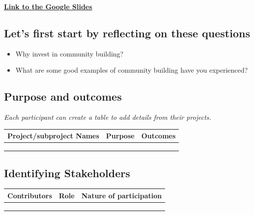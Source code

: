 \documentclass[
  letterpaper,
  DIV=11,
  numbers=noendperiod]{scrreport}
\providecommand{\tightlist}{%
  \setlength{\itemsep}{0pt}\setlength{\parskip}{0pt}}\usepackage{longtable,booktabs,array}
\begin{document}
\href{https://docs.google.com/presentation/d/18kxCLkNEZBVfZ-IBMkE_Un0W67MBoEPbGabygMvqeRY/edit\#slide=id.g13faa93073d_0_111}{\textbf{Link
to the Google Slides}}

\hypertarget{lets-first-start-by-reflecting-on-these-questions}{%
\subsection{Let's first start by reflecting on these
questions}\label{lets-first-start-by-reflecting-on-these-questions}}

\begin{itemize}
\tightlist
\item
  Why invest in community building?
\item
  What are some good examples of community building have you
  experienced?
\end{itemize}

\hypertarget{purpose-and-outcomes}{%
\subsection{\texorpdfstring{\textbf{Purpose and
outcomes}}{Purpose and outcomes}}\label{purpose-and-outcomes}}

\emph{Each participant can create a table to add details from their
projects.}

\begin{longtable}[]{@{}lll@{}}
\toprule\noalign{}
\textbf{Project/subproject Names} & \textbf{Purpose} &
\textbf{Outcomes} \\
\midrule\noalign{}
\endhead
\bottomrule\noalign{}
\endlastfoot
& & \\
& & \\
& & \\
\end{longtable}

\hypertarget{identifying-stakeholders}{%
\subsection{\texorpdfstring{\textbf{Identifying
Stakeholders}}{Identifying Stakeholders}}\label{identifying-stakeholders}}

\begin{longtable}[]{@{}lll@{}}
\toprule\noalign{}
\textbf{Contributors} & \textbf{Role} & \textbf{Nature of
participation} \\
\midrule\noalign{}
\endhead
\bottomrule\noalign{}
\endlastfoot
& & \\
& & \\
& & \\
\end{longtable}
\end{document}

